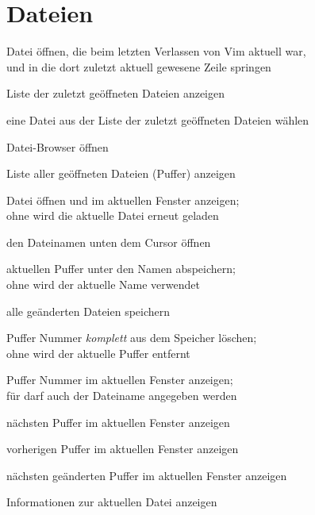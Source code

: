 \documentclass
[
  draft    = true,
  fontsize = 11pt,
  parskip  = half,
  BCOR     = 0pt,
  DIV      = calc,
  ngerman
]
{scrartcl}
\begin{document}
\section{Dateien}
\begin{mytemize}
  \renewcommand{\cmdwidth}{5em}%
  \item {}       Datei öffnen, die beim letzten Verlassen von Vim aktuell war,\\
        \vimcmd{}{}{}         und in die dort zuletzt aktuell gewesene Zeile springen
  \item {}      Liste der zuletzt geöffneten Dateien anzeigen
  \item {}  eine Datei aus der Liste der zuletzt geöffneten Dateien wählen
  \item {}   Datei-Browser öffnen
  \item {}      Liste aller geöffneten Dateien (Puffer) anzeigen
  \item {}      Datei  öffnen und im aktuellen Fenster anzeigen;\\
        \vimcmd{}{}{}         ohne  wird die aktuelle Datei erneut geladen
  \item {}       den Dateinamen unten dem Cursor öffnen
  \item {}      aktuellen Puffer unter den Namen  abspeichern;\\
        \vimcmd{}{}{}         ohne  wird der aktuelle Name verwendet
  \item {}      alle geänderten Dateien speichern
  \item {}     Puffer Nummer  \emph{komplett} aus dem Speicher löschen;\\
        \vimcmd{}{}{}         ohne  wird der aktuelle Puffer entfernt
  \item {}      Puffer Nummer  im aktuellen Fenster anzeigen;\\
        \vimcmd{}{}{}         für  darf auch der Dateiname angegeben werden
  \item {}      nächsten Puffer im aktuellen Fenster anzeigen
  \item {}      vorherigen Puffer im aktuellen Fenster anzeigen
  \item {}      nächsten geänderten Puffer im aktuellen Fenster anzeigen
  \item {}       Informationen zur aktuellen Datei anzeigen

\end{mytemize}
\end{document}
